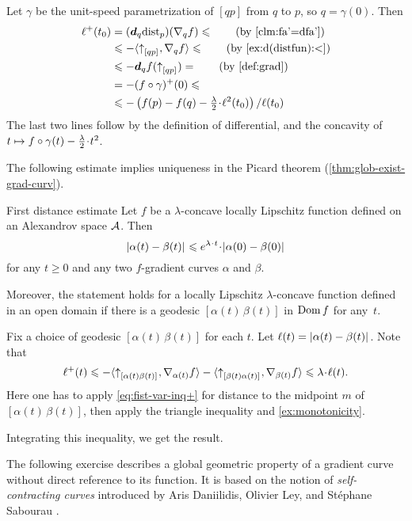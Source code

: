 Let $\gamma$ be the unit-speed parametrization of $[qp]$ from $q$ to $p$, so $q=\gamma(0)$.
Then 
\begin{align*}
\ell^+(t_0)&=(\dd_q\distfun_p)(\nabla_qf)\le\tag{by \ref{clm:fa'=dfa'}}
\\
&\le -\langle\dir qp,\nabla_qf\rangle \le \tag{by \ref{ex:d(distfun):<}}
\\
&\le -\dd_qf(\dir qp)=\tag{by \ref{def:grad}}
\\
&=-(f\circ\gamma)^+(0)\le 
\\
&\le -\left({f(p)}-{f(q)}-\tfrac\lambda2\cdot\ell^2(t_0)\right)/\ell(t_0)
\end{align*}
The last two lines follow by
the definition of differential,
and the concavity of $t\z\mapsto f\circ\gamma(t)-\tfrac \lambda2\cdot {t^2}$.
\qeds

The following estimate implies uniqueness in the Picard theorem (\ref{thm:glob-exist-grad-curv}).

\begin{thm}{First distance estimate}\label{thm:dist-est}
Let $f$ be a $\lambda$-concave locally Lipschitz function defined on an Alexandrov space $\mathcal{A}$.
Then
\[\dist{\alpha(t)}{\beta(t)}{}
\le 
e^{\lambda\cdot t}\cdot\dist[{{}}]{\alpha(0)}{\beta(0)}{}\]
for any $t\ge 0$ and any two $f$-gradient curves $\alpha$ and $\beta$.

Moreover, the statement holds for a locally Lipschitz $\lambda$-concave function defined in an open domain if there is a geodesic $[\alpha(t)\,\beta(t)]$ in $\mathop{\rm Dom}\nolimits f$ for any~$t$.
\end{thm}

Fix a choice of geodesic $[\alpha(t)\,\beta(t)]$ for each $t$.
Let $\ell(t)=|{\alpha(t)}-{\beta(t)}|_{}^{{}}$. 
Note that
\[\ell^+(t)
\le-
\<\dir{\alpha(t)}{\beta(t)},\nabla_{\alpha(t)}f\>-\<\dir{\beta(t)}{\alpha(t)},\nabla_{\beta(t)}f\>
\le
\lambda\cdot\ell(t).\]
Here one has to apply \ref{eq:fist-var-inq+} for distance to the midpoint $m$ of $[\alpha(t)\,\beta(t)]$, then apply the triangle inequality and \ref{ex:monotonicity}.

Integrating this inequality, we get the result.
\qeds



The following exercise describes a global geometric property of a gradient curve without direct reference to its function.
It is based on the notion of \emph{self-contracting curves} introduced by Aris Daniilidis, Olivier Ley, and Stéphane Sabourau \cite{daniilidis-ley-sabourau}.

